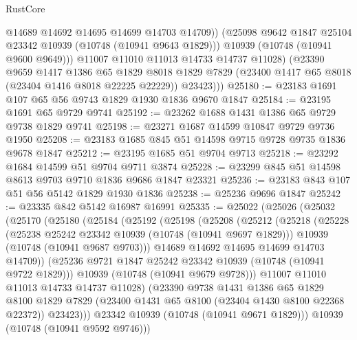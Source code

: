 \begin{lexlean}{RustCore}
\begin{coremodule}
                @14689
                @14692
                @14695
                @14699
                @14703
                @14709))
            (@25098 @9642 @1847 @25104 @23342 @10939 (@10748 (@10941 @9643 @1829)))
            @10939
            (@10748 (@10941 @9600 @9649)))
          @11007
          @11010
          @11013
          @14733
          @14737
          @11028)
        (@23390
          @9659
          @1417
          @1386
          @65
          @1829
          @8018
          @1829
          @7829
          (@23400 @1417 @65 @8018 (@23404 @1416 @8018 @22225 @22229))
          @23423)))
@25180 := @23183 @1691 @107 @65 @56 @9743 @1829 @1930 @1836 @9670 @1847
@25184 := @23195 @1691 @65 @9729 @9741
@25192 := @23262 @1688 @1431 @1386 @65 @9729 @9738 @1829 @9741
@25198 := @23271 @1687 @14599 @10847 @9729 @9736 @1950
@25208 := @23183 @1685 @845 @51 @14598 @9715 @9728 @9735 @1836 @9678 @1847
@25212 := @23195 @1685 @51 @9704 @9713
@25218 := @23292 @1684 @14599 @51 @9704 @9711 @3874
@25228 := @23299 @845 @51 @14598 @8613 @9703 @9710 @1836 @9686 @1847 @23321
@25236 := @23183 @843 @107 @51 @56 @5142 @1829 @1930 @1836
@25238 := @25236 @9696 @1847
@25242 := @23335 @842 @5142 @16987 @16991
@25335 := @25022
    (@25026
      (@25032
        (@25170
          (@25180
            (@25184
              (@25192
                (@25198
                  (@25208
                    (@25212
                      (@25218
                        (@25228
                          (@25238 @25242 @23342 @10939 (@10748 (@10941 @9697 @1829)))
                          @10939
                          (@10748 (@10941 @9687 @9703)))
                        @14689
                        @14692
                        @14695
                        @14699
                        @14703
                        @14709))
                    (@25236 @9721 @1847 @25242 @23342 @10939 (@10748 (@10941 @9722 @1829)))
                    @10939
                    (@10748 (@10941 @9679 @9728)))
                  @11007
                  @11010
                  @11013
                  @14733
                  @14737
                  @11028)
                (@23390
                  @9738
                  @1431
                  @1386
                  @65
                  @1829
                  @8100
                  @1829
                  @7829
                  (@23400 @1431 @65 @8100 (@23404 @1430 @8100 @22368 @22372))
                  @23423)))
            @23342
            @10939
            (@10748 (@10941 @9671 @1829)))
          @10939
          (@10748 (@10941 @9592 @9746)))

\end{coremodule}
\end{lexlean}
